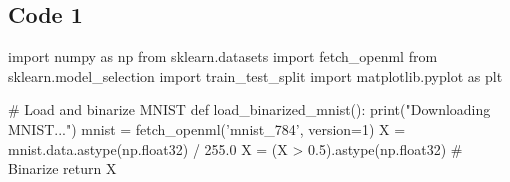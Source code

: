 \documentclass[%
oneside,                 %
final,                   %
10pt]{article}
\begin{document}
\subsection{Code 1}





































































































\bpycod
import numpy as np
from sklearn.datasets import fetch_openml
from sklearn.model_selection import train_test_split
import matplotlib.pyplot as plt

# Load and binarize MNIST
def load_binarized_mnist():
    print("Downloading MNIST...")
    mnist = fetch_openml('mnist_784', version=1)
    X = mnist.data.astype(np.float32) / 255.0
    X = (X > 0.5).astype(np.float32)  # Binarize
    return X
\end{document}

